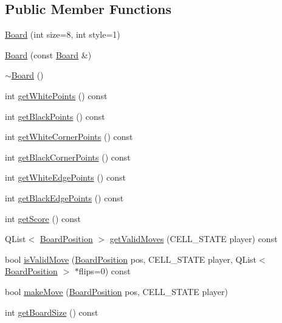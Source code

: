 \subsection*{Public Member Functions}
\begin{DoxyCompactItemize}
\item 
\hyperlink{class_board_aedb1406901eb82feff01d9684ab4cb91}{Board} (int size=8, int style=1)
\item 
\hyperlink{class_board_a19e2c1f6c2baf8ab04cbd02f0cd2aebc}{Board} (const \hyperlink{class_board}{Board} \&)
\item 
\hyperlink{class_board_af73f45730119a1fd8f6670f53f959e68}{$\sim$\+Board} ()
\item 
int \hyperlink{class_board_a6f3891976ea2c25f4f8dc0080f977790}{get\+White\+Points} () const 
\item 
int \hyperlink{class_board_a47e7bc86cf4a514755b19d1afd3f0439}{get\+Black\+Points} () const 
\item 
int \hyperlink{class_board_ada12da9ad1391f41ba8dedd2facda89a}{get\+White\+Corner\+Points} () const 
\item 
int \hyperlink{class_board_a851b3f28fac5f40bf86520c79a81aef2}{get\+Black\+Corner\+Points} () const 
\item 
int \hyperlink{class_board_a298926d014849a98b85447783206eebc}{get\+White\+Edge\+Points} () const 
\item 
int \hyperlink{class_board_af3146d4d320bf5c6733dda2386635baf}{get\+Black\+Edge\+Points} () const 
\item 
int \hyperlink{class_board_a9c39cd47355ff518c21b94c0db920ecf}{get\+Score} () const 
\item 
Q\+List$<$ \hyperlink{struct_board_position}{Board\+Position} $>$ \hyperlink{class_board_a4831db9ba9cbc5bda9e60340c0483f04}{get\+Valid\+Moves} (C\+E\+L\+L\+\_\+\+S\+T\+A\+T\+E player) const 
\item 
bool \hyperlink{class_board_a52164c04edb93365f5bbada6e8ed2210}{is\+Valid\+Move} (\hyperlink{struct_board_position}{Board\+Position} pos, C\+E\+L\+L\+\_\+\+S\+T\+A\+T\+E player, Q\+List$<$ \hyperlink{struct_board_position}{Board\+Position} $>$ $\ast$flips=0) const 
\item 
bool \hyperlink{class_board_a3216c03487fee2408c8f3fd17c508dcc}{make\+Move} (\hyperlink{struct_board_position}{Board\+Position} pos, C\+E\+L\+L\+\_\+\+S\+T\+A\+T\+E player)
\item 
int \hyperlink{class_board_a94624883394858c34303952ac29af5fe}{get\+Board\+Size} () const 
\item 

\end{DoxyCompactItemize}

